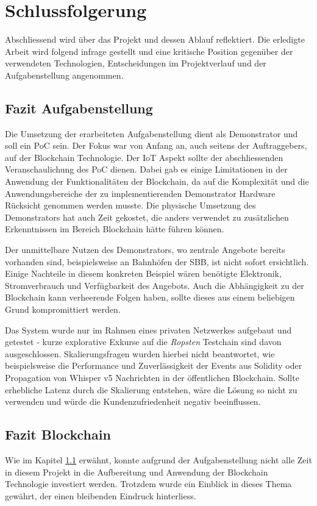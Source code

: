 \chapter{Schlussfolgerung}
\label{cha:Schlussfolgerung}

Abschliessend wird über das Projekt und dessen Ablauf reflektiert. Die erledigte Arbeit wird folgend infrage gestellt und eine kritische Position gegenüber der verwendeten Technologien, Entscheidungen im Projektverlauf und der Aufgabenstellung angenommen.

\section{Fazit Aufgabenstellung}
\label{sec:Fazit_Aufgabenstellung}
Die Umsetzung der erarbeiteten Aufgabenstellung dient als Demonstrator und soll ein \acrfull{PoC} sein. Der Fokus war von Anfang an, auch seitens der Auftraggebers, auf der Blockchain Technologie. Der \acrshort{IoT} Aspekt sollte der abschliessenden Veranschaulichung des \acrshort{PoC} dienen. Dabei gab es einige Limitationen in der Anwendung der Funktionalitäten der Blockchain, da auf die Komplexität und die Anwendungsbereiche der zu implementierenden Demonstrator Hardware Rücksicht genommen werden musste. Die physische Umsetzung des Demonstrators hat auch Zeit gekostet, die anders verwendet zu zusätzlichen Erkenntnissen im Bereich Blockchain hätte führen können.

Der unmittelbare Nutzen des Demonstrators, wo zentrale Angebote bereits vorhanden sind, beispielsweise an Bahnhöfen der SBB, ist nicht sofort ersichtlich. Einige Nachteile in diesem konkreten Beispiel wären benötigte Elektronik, Stromverbrauch und Verfügbarkeit des Angebots. Auch die Abhängigkeit zu der Blockchain kann verheerende Folgen haben, sollte dieses aus einem beliebigen Grund kompromittiert werden.

Das System wurde nur im Rahmen eines privaten Netzwerkes aufgebaut und getestet - kurze explorative Exkurse auf die \emph{Ropsten} Testchain sind davon ausgeschlossen. Skalierungsfragen wurden hierbei nicht beantwortet, wie beispielsweise die Performance und Zuverlässigkeit der Events aus Solidity oder Propagation von Whisper v5 Nachrichten in der öffentlichen Blockchain. Sollte erhebliche Latenz durch die Skalierung entstehen, wäre die Lösung so nicht zu verwenden und würde die Kundenzufriedenheit negativ beeinflussen.

\section{Fazit Blockchain}
Wie im Kapitel \ref{sec:Fazit_Aufgabenstellung} erwähnt, konnte aufgrund der Aufgabenstellung nicht alle Zeit in diesem Projekt in die Aufbereitung und Anwendung der Blockchain Technologie investiert werden. Trotzdem wurde ein Einblick in dieses Thema gewährt, der einen bleibenden Eindruck hinterliess.

